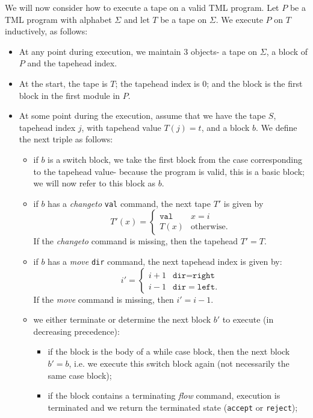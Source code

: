 \begin{appendices}
We will now consider how to execute a tape on a valid TML program. Let $P$ be a TML program with alphabet $\Sigma$ and let $T$ be a tape on $\Sigma$. We execute $P$ on $T$ inductively, as follows:
\begin{itemize}
    \item At any point during execution, we maintain 3 objects- a tape on $\Sigma$, a block of $P$ and the tapehead index. 
    \item At the start, the tape is $T$; the tapehead index is $0$; and the block is the first block in the first module in $P$. 
    \item At some point during the execution, assume that we have the tape $S$, tapehead index $j$, with tapehead value $T(j) = t$, and a block $b$. We define the next triple as follows:
    \begin{itemize}
        \item if $b$ is a switch block, we take the first block from the case corresponding to the tapehead value- because the program is valid, this is a basic block; we will now refer to this block as $b$.
        \item if $b$ has a \textit{changeto} \texttt{val} command, the next tape $T'$ is given by 
        \[T'(x) = \begin{cases}
            \texttt{val} & x = i \\
            T(x) & \text{otherwise}.
        \end{cases}\]
        If the \textit{changeto} command is missing, then the tapehead $T' = T$.
        \item if $b$ has a \textit{move} \texttt{dir} command, the next tapehead index is given by:
        \[i' = \begin{cases}
            i+1 & \texttt{dir} = \texttt{right} \\
            i-1 & \texttt{dir} = \texttt{left}.
        \end{cases}\]
        If the \textit{move} command is missing, then $i' = i-1$.
        \item we either terminate or determine the next block $b'$ to execute (in decreasing precedence):
        \begin{itemize}
            \item if the block is the body of a while case block, then the next block $b' = b$, i.e. we execute this switch block again (not necessarily the same case block);
            \item if the block contains a terminating \textit{flow} command, execution is terminated and we return the terminated state (\texttt{accept} or \texttt{reject});

\end{itemize}
\end{itemize}
\end{itemize}
\end{appendices}
